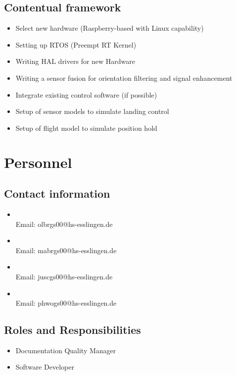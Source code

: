 \section{Contentual framework}
\label{sec:goals:framework}
\begin{itemize}
	\item Select new hardware (Raspberry-based with Linux capability) 
	\item Setting up RTOS (Preempt RT Kernel)
	\item Writing HAL drivers for new Hardware
	\item Writing a sensor fusion for orientation filtering and signal enhancement
	\item Integrate existing control software (if possible)
	\item Setup of sensor models to simulate landing control
	\item Setup of flight model to simulate position hold
\end{itemize}

\chapter{Personnel}
\label{sec:personnel}

\section{Contact information}
\label{sec:personnel:contact}
\begin{itemize}
	\item {}\\
				Email: olbrgs00@hs-esslingen.de
	\item {}\\
				Email: mabrgs00@hs-esslingen.de
	\item {}\\
				Email: juscgs00@hs-esslingen.de			 
	\item {}\\
				Email: phwogs00@hs-esslingen.de
\end{itemize}

\section{Roles and Responsibilities}
\label{sec:personnel:respons}
\begin{itemize}
	\item Documentation Quality Manager
	\item Software Developer
\end{itemize}


